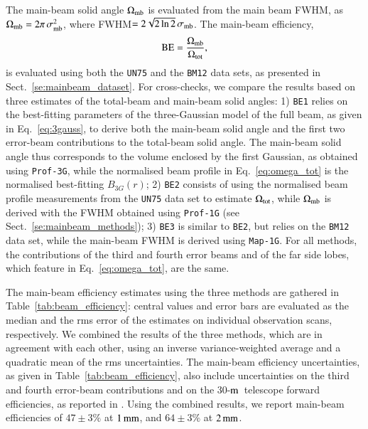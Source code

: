 \documentclass[traditionalabstract]{aa}
\newcommand{\trentemetre}{30-$\rm{m}$}
\newcommand{\rev}[1]{#1}
\newcommand{\LEt}[1]{{\bf {\color[RGB]{0, 153, 255} #1}}}
\begin{document}
{{\rev The main-beam solid angle $\Omega_{\rm{mb}}$ is evaluated from the main beam %
FWHM, as $\Omega_{\rm{mb}} = 2 \pi\,  \sigma_{\rm{mb}}^2$, where
FWHM$ =2\sqrt{2\ln{2}}\, \sigma_{\rm{mb}}$. The main-beam efficiency,
\begin{equation}
\rm{BE} = \frac{\Omega_{\rm{mb}}}{\Omega_{\rm{tot}}},
\end{equation}
is evaluated using both the {\tt UN75} and the {\tt BM12} data sets,
as presented in Sect.~\ref{se:mainbeam_dataset}.} For cross-checks, we
compare the results based on three estimates of the total-beam and
main-beam solid angles:
1) {\tt BE1} relies on the best-fitting parameters of the
    three-Gaussian model of the full beam, as given in
    Eq.~\ref{eq:3gauss}, to derive both the main-beam solid angle and
    the first two error-beam contributions to the total-beam solid
    angle. The main-beam solid angle thus corresponds to the volume
    enclosed by the first Gaussian, as obtained using {\tt Prof-3G},
    while the normalised beam profile in Eq.~\ref{eq:omega_tot} is the
    normalised best-fitting $B_{3G}(r)$;
2) {\tt BE2} consists of using the normalised beam profile
    measurements from the {\tt UN75} data set to estimate
    $\Omega_{\rm{tot}}$, while $\Omega_{\rm{mb}}$ is
    derived with the FWHM obtained using {\tt Prof-1G} (see
    Sect.~\ref{se:mainbeam_methods});
3) {\tt BE3} is similar to {\tt BE2}, but relies on the {\tt BM12}
    data set, while the main-beam FWHM is derived using {\tt Map-1G}.  
For all methods, the contributions of the third and fourth error beams
and of the far side lobes, which feature in Eq.~\ref{eq:omega_tot}, are
the same. 



The main-beam efficiency estimates using the three methods are gathered
in Table~\ref{tab:beam_efficiency}: central values and error
bars are evaluated as the median and the rms error of the
estimates on individual observation scans, respectively. 
{\rev We combined the results of the three methods, which are in
agreement with each other, using an inverse variance-weighted
average and a quadratic mean of the rms uncertainties. 
The main-beam efficiency uncertainties, as given in
Table~\ref{tab:beam_efficiency}, also include uncertainties on the
third and fourth error-beam contributions and on the \trentemetre\
telescope forward efficiencies, as reported
in \citet{Greve1998, Kramer2013}.}
Using the combined results, we report main-beam efficiencies of
{\rev $47 \pm 3 \%$ at $1\,\rm{mm}$, and  $64 \pm 3 \%$ at $2\,\rm{mm}$.}

}
\end{document}
